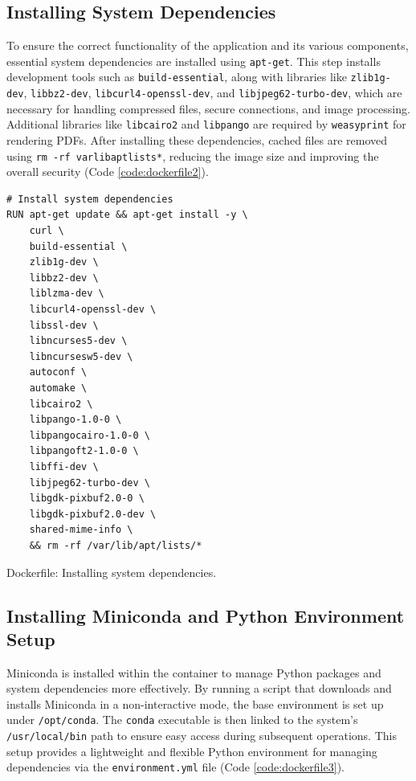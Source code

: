 \subsection{Installing System Dependencies}

To ensure the correct functionality of the application and its various components, essential system dependencies are installed using \texttt{apt-get}. This step installs development tools such as \texttt{build-essential}, along with libraries like \texttt{zlib1g-dev}, \texttt{libbz2-dev}, \texttt{libcurl4-openssl-dev}, and \texttt{libjpeg62-turbo-dev}, which are necessary for handling compressed files, secure connections, and image processing. Additional libraries like \texttt{libcairo2} and \texttt{libpango} are required by \texttt{weasyprint} for rendering PDFs. After installing these dependencies, cached files are removed using \texttt{rm -rf \/var\/lib\/apt\/lists\/*}, reducing the image size and improving the overall security (Code \ref{code:dockerfile2}).

\begin{longlisting}
\begin{verbatim}
# Install system dependencies
RUN apt-get update && apt-get install -y \
    curl \
    build-essential \
    zlib1g-dev \
    libbz2-dev \
    liblzma-dev \
    libcurl4-openssl-dev \
    libssl-dev \
    libncurses5-dev \
    libncursesw5-dev \
    autoconf \
    automake \
    libcairo2 \
    libpango-1.0-0 \
    libpangocairo-1.0-0 \
    libpangoft2-1.0-0 \
    libffi-dev \
    libjpeg62-turbo-dev \
    libgdk-pixbuf2.0-0 \
    libgdk-pixbuf2.0-dev \
    shared-mime-info \
    && rm -rf /var/lib/apt/lists/*
\end{verbatim}
\caption{Dockerfile: Installing system dependencies.}
\label{code:dockerfile2}
\end{longlisting}

\subsection{Installing Miniconda and Python Environment Setup}

Miniconda is installed within the container to manage Python packages and system dependencies more effectively. By running a script that downloads and installs Miniconda in a non-interactive mode, the base environment is set up under \texttt{/opt/conda}. The \texttt{conda} executable is then linked to the system's \texttt{/usr/local/bin} path to ensure easy access during subsequent operations. This setup provides a lightweight and flexible Python environment for managing dependencies via the \texttt{environment.yml} file (Code \ref{code:dockerfile3}).

